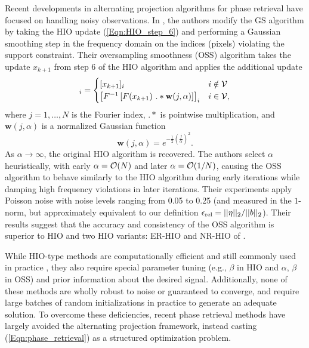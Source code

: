 Recent developments in alternating projection algorithms for phase retrieval have focused on handling noisy observations.  In \cite{rodriguez2013oversampling}, the authors modify the GS algorithm by taking the HIO update (\ref{Eqn:HIO_step_6}) and performing a Gaussian smoothing step in the frequency domain on the indices (pixels) violating the support constraint.  
Their oversampling smoothness (OSS) algorithm takes the update $x_{k+1}$ from step 6 of the HIO algorithm and applies the additional update
\begin{equation}
[x_{k+1}]_i =
	\begin{cases}
		[x_{k+1}]_i		&	i \notin \caV		\\
		\left[ F^{ -1} \left[ F ( x_{k+1}) \ .* \mathbf{w}(j, \alpha) \right]  \right]_i	&	 i \in \caV,
	\end{cases}
\end{equation}
where $j = 1, \ldots, N$ is the Fourier index, $.*$ is pointwise multiplication, and $\mathbf{w}(j, \alpha)$ is a normalized Gaussian function
\[
\mathbf{w}(j, \alpha) = e^ {- \frac{1}{2} \left(\frac{j}{\alpha} \right)^2}.
\]
As $\alpha \rightarrow \infty$, the original HIO algorithm is recovered.  
The authors select $\alpha$ heuristically, with early $\alpha = {\mathcal O}(N)$ and later $\alpha = {\mathcal O}(1/N)$, causing the OSS algorithm to behave similarly to the HIO algorithm during early iterations while damping high frequency violations in later iterations.  
Their experiments \cite[Section 3]{rodriguez2013oversampling} apply Poisson noise with noise levels ranging from 0.05 to 0.25 (and measured in the $1$-norm, but approximately equivalent to our definition $\epsilon_\textnormal{rel} = ||\eta||_2 / ||b||_2$).  
Their results suggest that the accuracy and consistency of the OSS algorithm is superior to HIO and two HIO variants: ER-HIO and NR-HIO of \cite{martin2012noise}.  



While HIO-type methods are computationally efficient and still commonly used in practice \cite{DBLP:journals/corr/JaganathanEH15a}, they also require special parameter tuning (e.g., $\beta$ in HIO and $\alpha$, $\beta$ in OSS) and prior information about the desired signal.  
Additionally, none of these methods are wholly robust to noise or guaranteed to converge, and require large batches of random initializations in practice to generate an adequate solution.  
To overcome these deficiencies, recent phase retrieval methods have largely avoided the alternating projection framework, instead casting (\ref{Eqn:phase_retrieval}) as a structured optimization problem.





